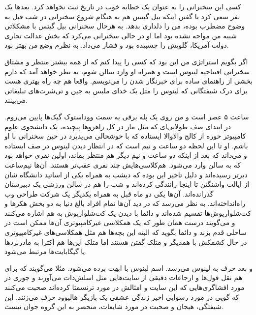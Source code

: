 کسی این سخنرانی را به عنوان یک خطابه خوب در تاریخ ثبت نخواهد
کرد. بعدها یک نفر سعی کرد با گفتن اینکه بیل گیتس هم به هنگام شروع
سخنرانی در شب قبل به وضوح مضطرب بوده، من را دلداری بدهد. به هرحال
سخنرانی بیل گیتس با مشکلاتی شبیه من مواجه نشده بود اما او در حالی
سخنرانی می‌کرد که بخش عدالت تجاری دولت آمریکا، گلویش را چسبیده بود و
فشار می‌داد. به نظرم وضع من بهتر بود.

\begin{journal}
اگر بگویم استراتژی من این بود که کسی را پیدا کنم که از همه بیشتر منتظر
و مشتاق سخنرانی افتتاحیه لینوس است و همراه او وارد سالن شوم، به نظر
خواهد آمد که دارم بخشی از راهنمای ساده برای خبرنگار شدن را
می‌نویسم. واقعا هم چه راه بهتری هست برای درک شیفتگانی که لینوس را مثل
یک خدای ملبس به جین و تی‌شرت‌های تبلیغاتی می‌بینند.

ساعت ۵ عصر است و من روی یک پله برقی به سمت ووداستوک گیک‌ها
پایین می‌روم. در ابتدای صف طولانی‌ای که مثل مار در کل راهروها پیچیده، یک
دانشجوی علوم کامپیوتر خوره از کالج والاوالا ایستاده که با خوشحالی می‌پذیرد در حین سخنرانی با او باشم. او
تا این لحظه دو ساعت و نیم است که در انتظار دیدن لینوس در صف ایستاده و
می‌داند که بعد از اینکه دو ساعت و نیم دیگر هم منتظر بماند، اولین نفری
خواهد بود که به سالن وارد می‌شود. هم‌کلاسی‌هایش چند نفری عقب‌تر
هستند. آن‌ها نیم‌ساعت دیرتر رسیده‌اند و دلیل تاخیر این بوده که دیشب به
همراه یکی از اساتید دانشگاه شان از ایالت واشنگتن تا اینجا رانندگی
کرده‌اند و شب را هم در سالن ورزشی یک دبیرستان گذرانده‌اند. آن‌ها یکی دو
ماه قبل به همراه یکدیگر یک شرکت طراحی وب راه‌انداخته‌اند. به نظر می‌رسد
که در دید آن‌ها تمام افراد بالغ دنیا به دو بخش هکرها و کت‌شلوارپوش‌ها
تقسیم شده‌اند و دائما با دیدن یک کت‌شلوارپوش‌ به هم اشاره می‌کنند و
می‌گویند  درست همان طور
که یک همکلاسی غیرکامپیوتری آن‌ها ممکن است در ساحلی قدم بزند و دائما
بگوید که  البته این بچه‌ها هم مثل
همکلاسی‌های غیرکامپیوتری در حال کشمکش با همدیگر و متلک گفتن هستند اما
متلک این‌ها هم اکثرا به مادربردها یا گیگابایت‌ها مرتبط می‌شود.

و بعد حرف به لینوس می‌رسد. اسم لینوس با ابهت برده می‌شود. مثلا می‌گویند
که  برای هم نقل قول‌ها و ارجاعات دقیقی از سایت‌هایی
مثل اسلش‌دات می‌آورند و جوری در مورد افشاگری‌هایی
که این سایت و امثالش در مورد ترنسمتا کرده‌اند صحبت می‌کنند که گویی در
مورد رسوایی اخیر زندگی عشقی یک بازیگر هالیوود حرف می‌زنند. این شیفتگی،
هیجان و صحبت در مورد شایعات، منحصر به این گروه جوان نیست.


\end{journal}
